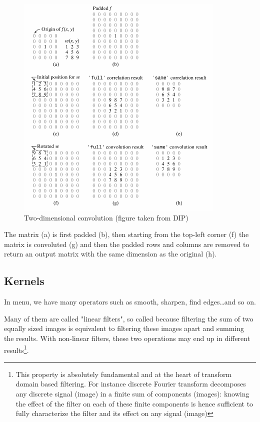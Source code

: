 \begin{figure}[htbp]
\begin{center}
\includegraphics[width=10cm]{fig/CMCIBasicCourse201102-img52.png}
\caption{ Two-dimensional convolution (figure taken from DIP)}
\label{fig:img52}
\end{center}
\end{figure}

The matrix (a) is first padded (b), then starting from the top-left
corner (f) the matrix is convoluted (g) and then the padded rows and
columns are removed to return an output matrix with the same dimension
as the original (h).

\subsection{Kernels}

In \ijmenu{[Process]} menu, we have many operators such
as smooth, sharpen, find edges\dots and so on. 


Many of them are called "linear filters", so called because filtering the sum of two equally sized images is equivalent to filtering these images apart and summing the results. With non-linear filters, these two operations may end up in different results\footnote{This property is absolutely fundamental and at the heart of transform domain based filtering. For instance discrete Fourier transform decomposes any discrete signal (image) in a finite sum of components (images): knowing the effect of the filter on each of these finite components is hence sufficient to fully characterize the filter and its effect on any signal (image)}. 

